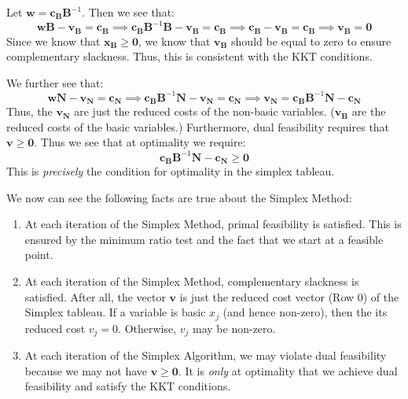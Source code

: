 Let $\mathbf{w} = \mathbf{c}_\mathbf{B}\mathbf{B}^{-1}$. Then we see that:
\begin{equation}
\mathbf{w}\mathbf{B} - \mathbf{v}_\mathbf{B} = \mathbf{c}_\mathbf{B} \implies \mathbf{c}_\mathbf{B}\mathbf{B}^{-1}\mathbf{B} - \mathbf{v}_\mathbf{B} = \mathbf{c}_\mathbf{B} \implies \mathbf{c}_\mathbf{B} - \mathbf{v}_\mathbf{B} = \mathbf{c}_\mathbf{B} \implies \mathbf{v}_\mathbf{B} = \mathbf{0}
\end{equation}
Since we know that $\mathbf{x}_\mathbf{B} \geq \mathbf{0}$, we know that $\mathbf{v}_\mathbf{B}$ should be equal to zero to ensure complementary slackness. Thus, this is consistent with the KKT conditions.

We further see that:
\begin{equation}
\mathbf{w}\mathbf{N} - \mathbf{v}_\mathbf{N} = \mathbf{c}_\mathbf{N} \implies
\mathbf{c}_\mathbf{B}\mathbf{B}^{-1}\mathbf{N} - \mathbf{v}_\mathbf{N} = \mathbf{c}_\mathbf{N} \implies 
\mathbf{v}_\mathbf{N} = \mathbf{c}_\mathbf{B}\mathbf{B}^{-1}\mathbf{N} - \mathbf{c}_\mathbf{N}
\end{equation}
Thus, the $\mathbf{v}_\mathbf{N}$ are just the reduced costs of the non-basic variables. ($\mathbf{v}_\mathbf{B}$ are the reduced costs of the basic variables.) Furthermore, dual feasibility requires that $\mathbf{v} \geq \mathbf{0}$. Thus we see that at optimality we require:
\begin{equation}
\mathbf{c}_\mathbf{B}\mathbf{B}^{-1}\mathbf{N} - \mathbf{c}_\mathbf{N} \geq \mathbf{0}
\end{equation}
This is \textit{precisely} the condition for optimality in the simplex tableau. 

We now can see the following facts are true about the Simplex Method:
\begin{enumerate}
\item At each iteration of the Simplex Method, primal feasibility is satisfied. This is ensured by the minimum ratio test and the fact that we start at a feasible point.

\item At each iteration of the Simplex Method, complementary slackness is satisfied. After all, the vector $\mathbf{v}$ is just the reduced cost vector (Row 0) of the Simplex tableau. If a variable is basic $x_j$ (and hence non-zero), then the its reduced cost $v_j = 0$. Otherwise, $v_j$ may be non-zero.

\item At each iteration of the Simplex Algorithm, we may violate dual feasibility because we may not have $\mathbf{v} \geq \mathbf{0}$. It is \textit{only} at optimality that we achieve dual feasibility and satisfy the KKT conditions. 
\end{enumerate}

